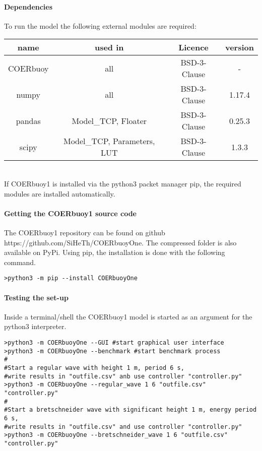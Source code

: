 \documentclass[oneside,10pt,a4paper]{book}
\begin{document}
\paragraph{Dependencies}
To run the model the following external modules are required:\\
	\begin{tabular}{|c|c|c|c|}
		\hline
		name & used in & Licence & version \\
		\hline
		COERbuoy &all&BSD-3-Clause& - \\
		\hline
		numpy &all&BSD-3-Clause& 1.17.4 \\
		\hline
		pandas&Model\_TCP, Floater&BSD-3-Clause&0.25.3\\
		\hline
		scipy&Model\_TCP, Parameters, LUT&BSD-3-Clause&1.3.3\\
		\hline
	\end{tabular}\\
If COERbuoy1 is installed via the python3 packet manager pip, the required modules are installed automatically.
\paragraph{Getting the COERbuoy1 source code}
The COERbuoy1 repository can be found on github https://github.com/SiHeTh/COERbuoyOne. The compressed folder is also available on PyPi. Using pip, the installation is done with the following command.
\begin{verbatim}
>python3 -m pip --install COERbuoyOne
\end{verbatim}
\paragraph{Testing the set-up}
Inside a terminal/shell the COERbuoy1 model is started as an argument for the python3 interpreter.
\begin{verbatim}
>python3 -m COERbuoyOne --GUI #start graphical user interface
>python3 -m COERbuoyOne --benchmark #start benchmark process
#
#Start a regular wave with height 1 m, period 6 s,
#write results in "outfile.csv" anb use controller "controller.py"
>python3 -m COERbuoyOne --regular_wave 1 6 "outfile.csv" "controller.py"
#
#Start a bretschneider wave with significant height 1 m, energy period 6 s,
#write results in "outfile.csv" and use controller "controller.py"
>python3 -m COERbuoyOne --bretschneider_wave 1 6 "outfile.csv" "controller.py"
\end{verbatim}
\end{document}
